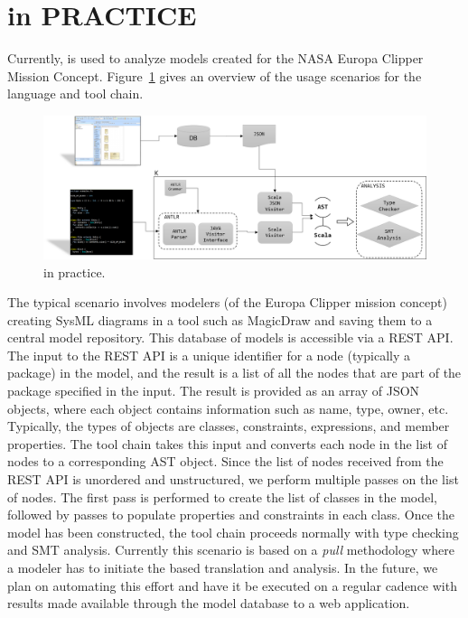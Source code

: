 \section{\Klang{} in PRACTICE}
\label{sec:usage}

Currently, \Klang{} is used to analyze models created for the NASA
Europa Clipper Mission Concept. Figure~\ref{fig:k} gives an overview
of the usage scenarios for the \Klang{} language and tool chain.

\begin{figure}[!t]
\centering
\includegraphics[scale=0.49]{K.png}
\caption{\Klang{} in practice.}
\label{fig:k}
\end{figure}

The typical scenario involves modelers (of the Europa Clipper mission
concept) creating SysML diagrams in a tool such as MagicDraw and
saving them to a central model repository. This database of models is
accessible via a REST API. The input to the REST API is a unique
identifier for a node (typically a \sysml{} package) in the model, and
the result is a list of all the nodes that are part of the package
specified in the input. The result is provided as an array of JSON
objects, where each object contains information such as name, type,
owner, etc. Typically, the types of objects are classes, constraints,
expressions, and member properties. The \Klang{} tool chain takes this
input and converts each node in the list of nodes to a corresponding
\Klang{} AST object. Since the list of nodes received from the REST
API is unordered and unstructured, we perform multiple passes on the
list of nodes. The first pass is performed to create the list of
classes in the model, followed by passes to populate properties and
constraints in each class. Once the \Klang{} model has been
constructed, the \Klang{} tool chain proceeds normally with type
checking and SMT analysis. Currently this scenario is based on a {\em
  pull} methodology where a modeler has to initiate the \Klang{} based
translation and analysis. In the future, we plan on automating this
effort and have it be executed on a regular cadence with results made
available through the model database to a web application.

